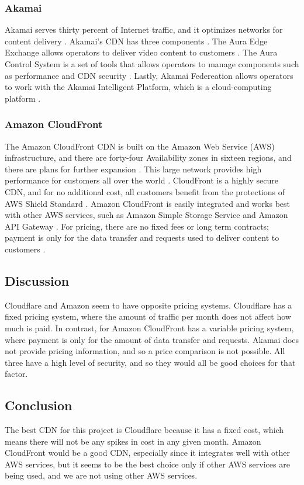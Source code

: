 \documentclass[onecolumn, draftclsnofoot,10pt, compsoc]{IEEEtran}
\begin{document}
\subsubsection{Akamai}
Akamai serves thirty percent of Internet traffic, and it optimizes networks for content delivery \cite{akamaicdn}. Akamai's CDN has three components \cite{akamaicdn}. The Aura Edge Exchange allows operators to deliver video content to customers \cite{akamaicdn}. The Aura Control System is a set of tools that allows operators to manage components such as performance and CDN security \cite{akamaicdn}. Lastly, Akamai Federeation allows operators to work with the Akamai Intelligent Platform, which is a cloud-computing platform \cite{akamaicdn}.  

\subsubsection{Amazon CloudFront}
The Amazon CloudFront CDN is built on the Amazon Web Service (AWS) infrastructure, and there are forty-four Availability zones in sixteen regions, and there are plans for further expansion \cite{amazoncloudfront}. This large network provides high performance for customers all over the world \cite{amazoncloudfront}. CloudFront is a highly secure CDN, and for no additional cost, all customers benefit from the protections of AWS Shield Standard \cite{amazoncloudfront}. Amazon CloudFront is easily integrated and works best with other AWS services, such as Amazon Simple Storage Service and Amazon API Gateway \cite{amazoncloudfront}. For pricing, there are no fixed fees or long term contracts; payment is only for the data transfer and requests used to deliver content to customers \cite{amazoncloudfront}.


\subsection{Discussion}
Cloudflare and Amazon seem to have opposite pricing systems. Cloudflare has a fixed pricing system, where the amount of traffic per month does not affect how much is paid. In contrast, for Amazon CloudFront has a variable pricing system, where payment is only for the amount of data transfer and requests. Akamai does not provide pricing information, and so a price comparison is not possible. All three have a high level of security, and so they would all be good choices for that factor.

\subsection{Conclusion}
The best CDN for this project is Cloudflare because it has a fixed cost, which means there will not be any spikes in cost in any given month. Amazon CloudFront would be a good CDN, especially since it integrates well with other AWS services, but it seems to be the best choice only if other AWS services are being used, and we are not using other AWS services.
\end{document}
